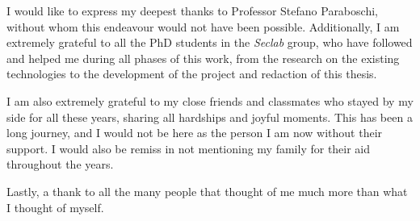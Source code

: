 I would like to express my deepest thanks to Professor Stefano Paraboschi, without whom
this endeavour would not have been possible.
Additionally, I am extremely grateful to all the PhD students in the \textit{Seclab} group,
who have followed and helped me during all phases of this work, from the research on
the existing technologies to the development of the project and redaction of this thesis.

I am also extremely grateful to my close friends and classmates who stayed by my side
for all these years, sharing all hardships and joyful moments.
This has been a long journey, and I would not be here as the person I am now
without their support.
I would also be remiss in not mentioning my family for their aid throughout the years.

Lastly, a thank to all the many people that thought of me much more than what I thought of myself.